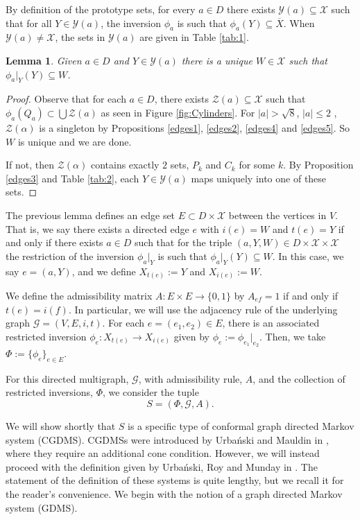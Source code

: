 \documentclass[11pt]{amsart}
\theoremstyle{plain}
\newtheorem{lemma}[theorem]{Lemma}
\theoremstyle{definition}
\renewcommand\~{\tilde}%
\newcommand{\cG}{\ensuremath{\mathcal{G}}}
\newcommand{\cX}{\ensuremath{\mathcal{X}}}
\newcommand{\cY}{\ensuremath{\mathcal{Y}}}
\newcommand{\cZ}{\ensuremath{\mathcal{Z}}}
\numberwithin{equation}{section}
\begin{document}
By definition of the prototype sets, for every $a\in D $ there exists 
$\cY(a)\subseteq \cX$ such that for all $Y\in \cY(a)$, the inversion $\phi_a$ is such that $\phi_a(Y)\subseteq \overline{X}$. When $\cY(a)\neq \cX$, the sets in $\cY(a)$ are given in Table \ref{tab:1}. 
\begin{lemma}
    Given $a\in D$ and $Y\in \cY(a)$ there is a unique $W\in \cX$ such that $\phi_{a}\vert_Y(Y)\subseteq W$. 
\end{lemma}
\begin{proof}
Observe that for each $a\in D$, there exists $\cZ(a)\subseteq \cX$ such that $\phi_a(Q_a)\subset\bigcup \cZ(a)$ as seen in Figure \ref{fig:Cylinders}. For $|a|>\sqrt{8}$, $|a| \leq 2$ , $\cZ(\alpha)$ is a singleton by Propositions \ref{edges1}, \ref{edges2}, \ref{edges4} and \ref{edges5}. So $W$ is unique and we are done. 

If not, then $\cZ(\alpha)$ contains exactly $2$ sets, $P_k$ and $C_k$ for some $k$. By Proposition \ref{edges3} and Table \ref{tab:2}, each $Y\in \cY(a)$ maps uniquely into one of these sets.
\end{proof}

The previous lemma defines an edge set $E\subset D\times \cX$ between the vertices in $V$. That is, we say there exists a directed edge $e$ with $i(e) = W$ and $t(e)=Y$ if and only if there exists $a \in D$ such that for the triple $(a,Y,W)\in D\times \cX\times \cX$ the restriction of the inversion $\phi_a\vert_Y$ is such that $\phi_a\vert_Y(Y)\subseteq W$. In this case, we say $e=(a,Y)$, and we define $X_{t(e)} := Y$ and $X_{i(e)}:= W$. 


We define the admissibility matrix $A:E\times E\to\{0,1\}$ by
$A_{ef}=1$ if and only if $t(e)=i(f)$. In particular, we will use the adjacency rule of the underlying graph $\cG = (V,E,i,t)$. For each $e = (e_1,e_2)\in E$, there is an associated restricted inversion $\phi_e:X_{t(e)}\to X_{i(e)}$ given by $\phi_e := \phi_{e_1}\vert_{e_2}$. Then, we take $\Phi:=\{\phi_e\}_{e\in E}$.

For this directed multigraph, $\cG$, with admissibility rule, $A$, and the collection of restricted inversions, $\Phi$, we consider the tuple
$$
S=(\Phi,\cG,A).
$$

We will show shortly that $S$ is a specific type of conformal graph directed Markov system (CGDMS). CGDMSs were introduced by Urba\'nski and Mauldin in \cite{MU03}, where they require an additional cone condition. However, we will instead proceed with the definition given by Urba\'nski, Roy and Munday in \cite[Definition 19.3.1]{Urbanski22}. The statement of the definition of these systems is quite lengthy, but we recall it for the reader's convenience. We begin with the notion of a graph directed Markov system (GDMS).
\end{document}
